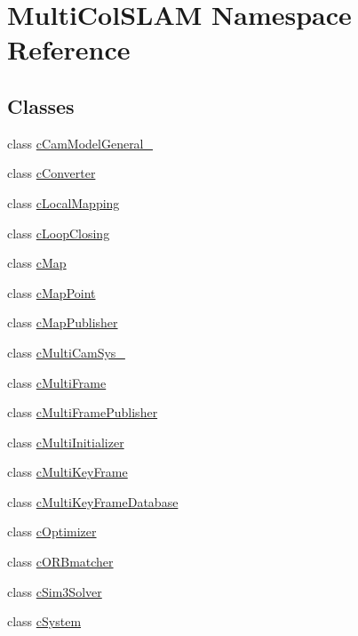 \hypertarget{namespaceMultiColSLAM}{}\section{Multi\+Col\+S\+L\+AM Namespace Reference}
\label{namespaceMultiColSLAM}
\subsection*{Classes}
\begin{DoxyCompactItemize}
\item 
class \hyperlink{classMultiColSLAM_1_1cCamModelGeneral__}{c\+Cam\+Model\+General\+\_\+}
\item 
class \hyperlink{classMultiColSLAM_1_1cConverter}{c\+Converter}
\item 
class \hyperlink{classMultiColSLAM_1_1cLocalMapping}{c\+Local\+Mapping}
\item 
class \hyperlink{classMultiColSLAM_1_1cLoopClosing}{c\+Loop\+Closing}
\item 
class \hyperlink{classMultiColSLAM_1_1cMap}{c\+Map}
\item 
class \hyperlink{classMultiColSLAM_1_1cMapPoint}{c\+Map\+Point}
\item 
class \hyperlink{classMultiColSLAM_1_1cMapPublisher}{c\+Map\+Publisher}
\item 
class \hyperlink{classMultiColSLAM_1_1cMultiCamSys__}{c\+Multi\+Cam\+Sys\+\_\+}
\item 
class \hyperlink{classMultiColSLAM_1_1cMultiFrame}{c\+Multi\+Frame}
\item 
class \hyperlink{classMultiColSLAM_1_1cMultiFramePublisher}{c\+Multi\+Frame\+Publisher}
\item 
class \hyperlink{classMultiColSLAM_1_1cMultiInitializer}{c\+Multi\+Initializer}
\item 
class \hyperlink{classMultiColSLAM_1_1cMultiKeyFrame}{c\+Multi\+Key\+Frame}
\item 
class \hyperlink{classMultiColSLAM_1_1cMultiKeyFrameDatabase}{c\+Multi\+Key\+Frame\+Database}
\item 
class \hyperlink{classMultiColSLAM_1_1cOptimizer}{c\+Optimizer}
\item 
class \hyperlink{classMultiColSLAM_1_1cORBmatcher}{c\+O\+R\+Bmatcher}
\item 
class \hyperlink{classMultiColSLAM_1_1cSim3Solver}{c\+Sim3\+Solver}
\item 
class \hyperlink{classMultiColSLAM_1_1cSystem}{c\+System}

\end{DoxyCompactItemize}
